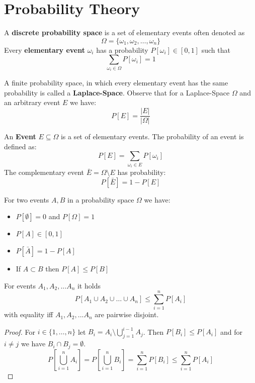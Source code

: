 \section{Probability Theory}

\begin{definition}
    A \textbf{discrete probability space} is a set of elementary events often denoted as 
    $$\Omega = \{ \omega_1, \omega_2, \dots, \omega_n \}$$
    Every \textbf{elementary event} $\omega_i$ has a probability $P[\omega_i] \in [0,1]$ such that
    $$\sum_{\omega_i \in \Omega} P[\omega_i] = 1$$
\end{definition}

\begin{remark}
    A finite probability space, in which every elementary event has the same probability is called a
    \textbf{Laplace-Space}. Observe that for a Laplace-Space $\Omega$ and an arbitrary event $E$ we have:
    $$P[E] = \frac{\vert E \vert}{\vert \Omega \vert}$$
\end{remark}

\begin{definition}
    An \textbf{Event} $E \subseteq \Omega$ is a set of elementary events. The probability of an event is defined as:
    $$P[E] = \sum_{\omega_i \in E} P[\omega_i]$$
    The complementary event $\bar{E} = \Omega \setminus E$ has probability:
    $$P[\bar{E}] = 1 - P[E]$$
\end{definition}

\begin{theorem}
    For two events $A, B$ in a probability space $\Omega$ we have:
    \begin{itemize}
        \item $P[\emptyset] = 0$ and $P[\Omega] = 1$
        \item $P[A] \in [0,1]$
        \item $P[\bar{A}] = 1 - P[A]$
        \item If $A \subset B$ then $P[A] \le P[B]$
    \end{itemize}
\end{theorem}

\begin{theorem}
    For events $A_1, A_2, ... A_n$ it holds
    $$P[A_1 \cup A_2 \cup \dots \cup A_n] \leq \sum_{i=1}^n P[A_i]$$
    with equality iff $A_1, A_2, ... A_n$ are pairwise disjoint.
\end{theorem}

\begin{proof}
    For $i \in \{1, \dots, n\}$ let $B_i = A_i \setminus \bigcup_{j=1}^{i-1} A_j$. Then $P[B_i] \leq P[A_i]$ and for $i \neq j$ we have $B_i \cap B_j = \emptyset$.
    $$P[\bigcup_{i=1}^n A_i] = P[\bigcup_{i=1}^n B_i] = \sum_{i=1}^n P[B_i] \leq \sum_{i=1}^n P[A_i]$$
\end{proof}

